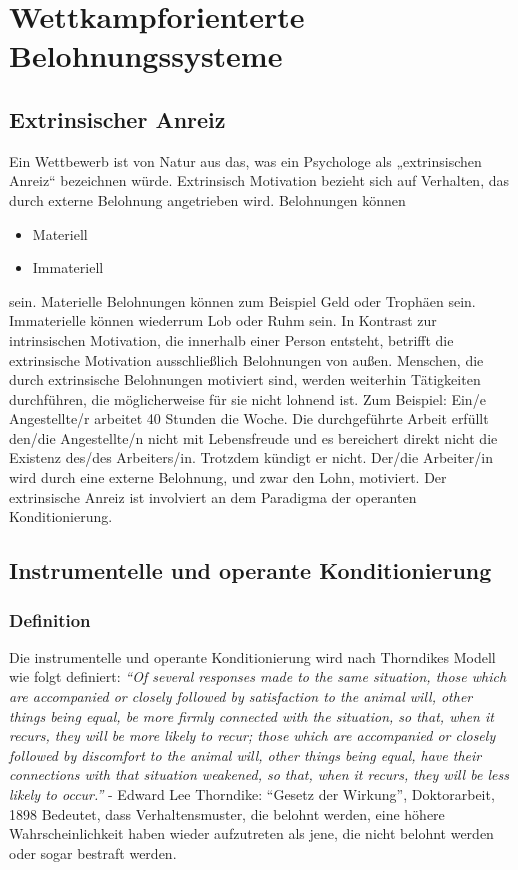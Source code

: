 \chapter{Wettkampforienterte Belohnungssysteme}
\reiter
\section{Extrinsischer Anreiz}	
Ein Wettbewerb ist von Natur aus das, was ein Psychologe als „extrinsischen Anreiz“ bezeichnen würde.
Extrinsisch Motivation bezieht sich auf Verhalten, das durch externe Belohnung angetrieben wird. Belohnungen können  
\begin{itemize}
	\item Materiell
	\item Immateriell
\end{itemize}	
sein. Materielle Belohnungen können zum Beispiel Geld oder Trophäen sein. Immaterielle können wiederrum Lob oder Ruhm sein. In Kontrast zur intrinsischen Motivation, die innerhalb einer Person entsteht, betrifft die extrinsische Motivation ausschließlich Belohnungen von außen. 
Menschen, die durch extrinsische Belohnungen motiviert sind, werden weiterhin Tätigkeiten durchführen, die möglicherweise für sie nicht lohnend ist. 
Zum Beispiel: Ein/e Angestellte/r arbeitet 40 Stunden die Woche. Die durchgeführte Arbeit erfüllt den/die Angestellte/n nicht mit Lebensfreude und es bereichert direkt nicht die Existenz des/des Arbeiters/in. Trotzdem kündigt er nicht. Der/die Arbeiter/in wird durch eine externe Belohnung, und zwar den Lohn, motiviert. 
Der extrinsische Anreiz ist involviert an dem Paradigma der operanten Konditionierung.
\section{Instrumentelle und operante Konditionierung}
\newpage
\subsection{Definition}	
Die instrumentelle und operante Konditionierung wird nach Thorndikes Modell wie folgt definiert: 
\textit{“Of several responses made to the same situation, those which are accompanied or closely followed by satisfaction to the animal will, other things being equal, be more firmly connected with the situation, so that, when it recurs, they will be more likely to recur; those which are accompanied or closely followed by discomfort to the animal will, other things being equal, have their connections with that situation weakened, so that, when it recurs, they will be less likely to occur.”} 
- Edward Lee Thorndike: “Gesetz der Wirkung”, Doktorarbeit, 1898 
Bedeutet, dass Verhaltensmuster, die belohnt werden, eine höhere Wahrscheinlichkeit haben wieder aufzutreten als jene, die nicht belohnt werden oder sogar bestraft werden. 

